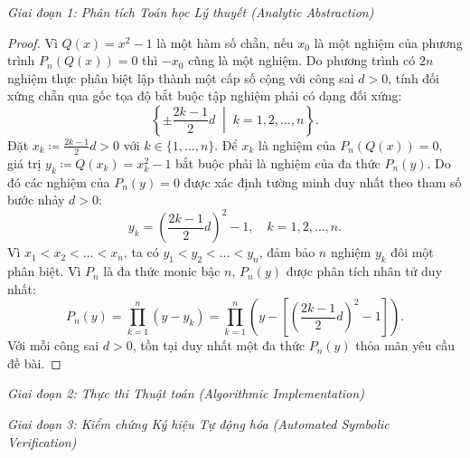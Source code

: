 \documentclass{article}
\begin{document}
\vspace{0.5em}\noindent\emph{Giai đoạn 1: Phân tích Toán học Lý thuyết (Analytic Abstraction)}

\begin{proof}
Vì $Q(x) = x^2 - 1$ là một hàm số chẵn, nếu $x_0$ là một nghiệm của phương trình $P_n(Q(x)) = 0$ thì $-x_0$ cũng là một nghiệm.
Do phương trình có $2n$ nghiệm thực phân biệt lập thành một cấp số cộng với công sai $d > 0$, tính đối xứng chẵn qua gốc tọa độ bắt buộc tập nghiệm phải có dạng đối xứng:
\begin{equation}
    \left\{ \pm \frac{2k - 1}{2} d \;\middle|\; k = 1, 2, \dots, n \right\}.
\end{equation}
Đặt $x_k \coloneqq \frac{2k - 1}{2} d > 0$ với $k \in \{1, \dots, n\}$.
Để $x_k$ là nghiệm của $P_n(Q(x)) = 0$, giá trị $y_k \coloneqq Q(x_k) = x_k^2 - 1$ bắt buộc phải là nghiệm của đa thức $P_n(y)$.
Do đó các nghiệm của $P_n(y) = 0$ được xác định tường minh duy nhất theo tham số bước nhảy $d > 0$:
\begin{equation}
    y_k = \left( \frac{2k - 1}{2} d \right)^2 - 1, \quad k = 1, 2, \dots, n.
\end{equation}
Vì $x_1 < x_2 < \dots < x_n$, ta có $y_1 < y_2 < \dots < y_n$, đảm bảo $n$ nghiệm $y_k$ đôi một phân biệt.
Vì $P_n$ là đa thức monic bậc $n$, $P_n(y)$ được phân tích nhân tử duy nhất:
\begin{equation}
    P_n(y) = \prod_{k=1}^n (y - y_k) = \prod_{k=1}^n \left( y - \left[ \left( \frac{2k - 1}{2} d \right)^2 - 1 \right] \right).
\end{equation}
Với mỗi công sai $d > 0$, tồn tại duy nhất một đa thức $P_n(y)$ thỏa mãn yêu cầu đề bài.
\end{proof}

\vspace{0.5em}\noindent\emph{Giai đoạn 2: Thực thi Thuật toán (Algorithmic Implementation)}


\vspace{0.5em}\noindent\emph{Giai đoạn 3: Kiểm chứng Ký hiệu Tự động hóa (Automated Symbolic Verification)}

\end{document}
